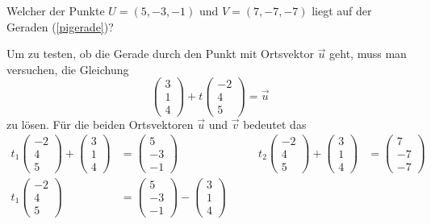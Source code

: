 \begin{beispiel} Welcher der Punkte $U=(5,-3,-1)$ und $V=(7,-7,-7)$
liegt auf der Geraden (\ref{pigerade})?

\smallskip

{\parindent 0pt Um zu testen},
ob die Gerade durch den Punkt mit Ortsvektor $\vec u$
geht, muss man versuchen, die Gleichung
\[
\begin{pmatrix}3\\1\\4 \end{pmatrix}
+t
\begin{pmatrix}-2\\4\\5\end{pmatrix}
=\vec u
\]
zu lösen.
Für die beiden Ortsvektoren $\vec u$ und $\vec v$
bedeutet das
\begin{align*}
t_1
\begin{pmatrix}-2\\4\\5\end{pmatrix}
+
\begin{pmatrix}3\\1\\4 \end{pmatrix}
&=
\begin{pmatrix}5\\-3\\-1\end{pmatrix}
&
\qquad
t_2
\begin{pmatrix}-2\\4\\5\end{pmatrix}
+
\begin{pmatrix}3\\1\\4 \end{pmatrix}
&=
\begin{pmatrix}7\\-7\\-7\end{pmatrix}
\\
t_1
\begin{pmatrix}-2\\4\\5\end{pmatrix}
&=
\begin{pmatrix}5\\-3\\-1\end{pmatrix}
-
\begin{pmatrix}3\\1\\4 \end{pmatrix}

\end{align*}
\end{beispiel}
